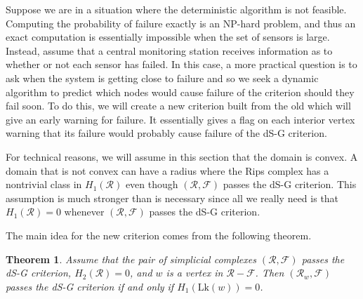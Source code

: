 \documentclass[10pt,twocolumn]{article} \usepackage{amsmath,epsf,amssymb,cite,pifont,amsthm, mathrsfs,epsfig,  bbm, amsthm,  setspace}
\newtheorem{thm}{Theorem}
\newcommand{\FF}{\mathcal F}
\newcommand{\RR}{\mathcal R}
\renewcommand{\1}{\mathbbm{1}}
\newcommand{\Lk}{\textrm{Lk}}
\newcommand{\RF}{\mathcal{R},\mathcal{F}}
\begin{document}
Suppose we are in a situation where the deterministic algorithm is not feasible.
Computing the probability of failure exactly is an NP-hard problem,
and thus an exact computation is essentially impossible when the set of sensors is large.
Instead, assume that a central monitoring station receives information as to whether or not each sensor has failed.
In this case, a more practical question is to ask when  the system is getting close to failure and so we seek a dynamic algorithm to predict which nodes would cause failure of the criterion should they fail soon.
To do this, we will create a new criterion built from the old which will give an early warning for failure.
It essentially gives a flag on each interior vertex warning that its failure would probably cause failure of the dS-G criterion.

For technical reasons, we will assume  in this section  that the domain is convex.
A domain that is not convex can have a radius where the Rips complex has a nontrivial class in $H_1(\RR)$ even though $(\RF)$ passes the dS-G criterion.
This assumption is much stronger than is necessary since all we really need
is  that $H_1(\RR)=0$ whenever $(\RF)$ passes the dS-G criterion.



The main idea for the new criterion comes from the following theorem.
\begin{thm}\label{Thm: New Criterion}
 Assume that the pair of simplicial complexes $(\RF)$ passes the dS-G criterion, $H_2(\RR)=0$, and $w$ is a vertex in $\RR-\FF$.
Then $(\RR_w,\FF)$ passes the dS-G criterion if and only if $H_1(\Lk(w))=0$.
\end{thm}
\end{document}
